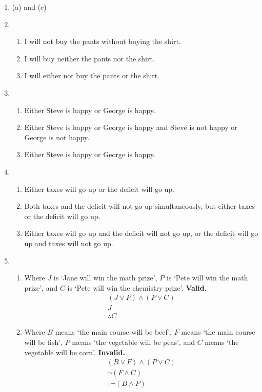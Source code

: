 \documentclass[a4paper, 11pt]{article}
\begin{document}
\begin{enumerate}
  \item (a) and (c)
  \item
        \begin{enumerate}
          \item I will not buy the pants without buying the shirt.
          \item I will buy neither the pants nor the shirt.
          \item I will either not buy the pants or the shirt.
        \end{enumerate}
  \item
        \begin{enumerate}
          \item Either Steve is happy or George is happy.
          \item Either Steve is happy or George is happy and Steve is not happy or George is not happy.
          \item Either Steve is happy or George is happy.
        \end{enumerate}
  \item
        \begin{enumerate}
          \item Either taxes will go up or the deficit will go up.
          \item Both taxes and the deficit will not go up simultaneously, but either taxes or the deficit will go up.
          \item Either taxes will go up and the deficit will not go up, or the deficit will go up and taxes will not go up.
        \end{enumerate}
  \item
        \begin{enumerate}
          \item Where $J$ is `Jane will win the math prize', $P$ is `Pete will win the math prize', and $C$ is `Pete will win the chemistry prize'. \textbf{Valid.}
                \begin{align*}
                  (J \vee P) \wedge (P \vee C) \\ J \\ \therefore C
                \end{align*}
          \item Where $B$ means `the main course will be beef', $F$ means `the main course will be fish', $P$ means `the vegetable will be peas', and $C$ means `the vegetable will be corn'. \textbf{Invalid.}
                \begin{align*}
                  (B \vee F) \wedge (P \vee C) \\ \neg(F \wedge C) \\ \therefore \neg (B \wedge P)

\end{align*}
\end{enumerate}
\end{enumerate}
\end{document}

